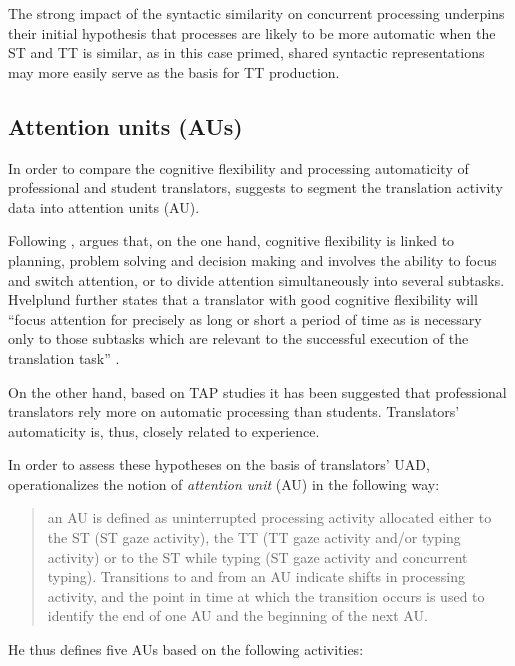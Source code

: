 \documentclass[output=paper]{LSP/langsci}
\begin{document}
The strong impact of the syntactic similarity on concurrent processing underpins their initial hypothesis that processes are likely to be more automatic when the ST and TT  is similar, as in this case primed, shared syntactic representations may more easily serve as the basis for TT production.

\subsection{Attention units (AUs)}
\label{carl-schaeffer:sec:3.2}

In order to compare the cognitive flexibility and processing automaticity of professional and student translators, \citet{Hvelplund2016} suggests to segment the translation activity data into attention units (AU).

Following \citet{Baddeley2007}, \citet{Hvelplund2016} argues that, on the one hand, cognitive flexibility is linked to planning, problem solving and decision making and involves the ability to focus and switch attention, or to divide attention simultaneously into several subtasks. Hvelplund further states that a translator with good cognitive flexibility will ``focus attention for precisely as long or short a period of time as is necessary only to those subtasks which are relevant to the successful execution of the translation task'' \citep[153]{Hvelplund2016}.


On the other hand, based on TAP studies \citep[e.g.][]{Jaaskelainen1991} it has been suggested that professional translators rely more on automatic processing than students. Translators' automaticity is, thus, closely related to experience.

In order to assess these hypotheses on the basis of translators' UAD, \citet[157]{Hvelplund2016} operationalizes the notion of \textit{attention unit} (AU) in the following way:

\begin{quote}
an AU is defined as uninterrupted processing activity allocated either to the ST (ST gaze activity), the TT (TT gaze activity and/or typing activity) or to the ST while typing (ST gaze activity and concurrent typing). Transitions to and from an AU indicate shifts in processing activity, and the point in time at which the transition occurs is used to identify the end of one AU and the beginning of the next AU. 
\end{quote}


He thus defines five AUs based on the following activities:
\end{document}
